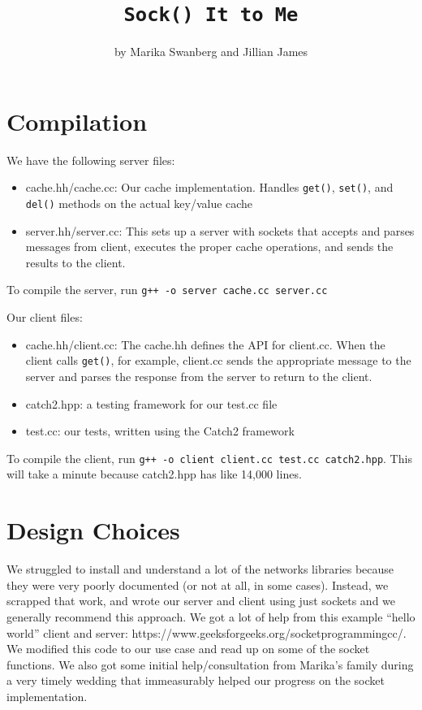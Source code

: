 \documentclass[12pt]{article}
\author{by Marika Swanberg and Jillian James}
\title{\texttt{Sock() It to Me}}
\date{}
\begin{document}
\maketitle
\bigskip 
\section{Compilation}
We have the following server files:
\begin{itemize}
\item cache.hh/cache.cc: Our cache implementation. Handles \texttt{get()}, \texttt{set()}, and  \texttt{del()} methods on the actual key/value cache
\item server.hh/server.cc: This sets up a server with sockets that accepts and parses messages from client, executes the proper cache operations, and sends the results to the client.
\end{itemize}
To compile the server, run \texttt{g++ -o server cache.cc server.cc} 
\bigskip

Our client files:
\begin{itemize}
\item cache.hh/client.cc: The cache.hh defines the API for client.cc. When the client calls \texttt{get()}, for example, client.cc sends the appropriate message to the server and parses the response from the server to return to the client.
\item catch2.hpp: a testing framework for our test.cc file
\item test.cc: our tests, written using the Catch2 framework
\end{itemize}
To compile the client, run \texttt{g++ -o client client.cc test.cc catch2.hpp}. This will take a minute because catch2.hpp has like 14,000 lines.
\section{Design Choices}
We struggled to install and understand a lot of the networks libraries because they were very poorly documented (or not at all, in some cases). Instead, we scrapped that work, and wrote our server and client using just sockets and we generally recommend this approach. We got a lot of help from this example ``hello world'' client and server: https:\//\//www.geeksforgeeks.org\//socket\-programming\-cc/. We modified this code to our use case and read up on some of the socket functions. We also got some initial help/consultation from Marika's family during a very timely wedding that immeasurably helped our progress on the socket implementation.
\end{document}
